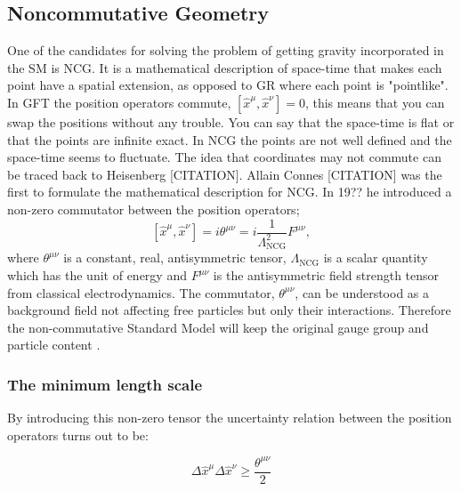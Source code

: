 \subsection{Noncommutative Geometry}
One of the candidates for solving the problem of getting gravity incorporated in the SM is NCG. It is a mathematical description of space-time that makes each point have a spatial extension, as opposed to GR where each point is "pointlike". In GFT the position operators commute, $[ \hat x^{\mu}, \hat x^{\nu}] = 0$, this means that you can swap the positions without any trouble. You can say that the space-time is flat or that the points are infinite exact. In NCG the points are not well defined and the space-time seems to fluctuate. The idea that coordinates may not commute can be traced back to Heisenberg [CITATION]. Allain Connes [CITATION] was the first to formulate the mathematical description for NCG. In 19?? he introduced a non-zero commutator between the position operators; \cite{rosendahl2008} 
\begin{equation} \label{eq:ncgtheta}
	[ \hat x^{\mu}, \hat x^{\nu}] = i \theta^{\mu \nu} = i \frac{1}{\Lambda_{\textrm{NCG}}^2} F^{\mu\nu},
\end{equation}
where $\theta^{\mu \nu}$ is a constant, real, antisymmetric tensor, $\Lambda_{\textrm{NCG}}$ is a scalar quantity which has the unit of energy and $F^{\mu\nu}$ is the antisymmetric field strength tensor from classical electrodynamics. The commutator, $\theta^{\mu \nu}$, can be understood as a background field not affecting free particles but only their interactions. Therefore the non-commutative Standard Model will keep the original gauge group and particle content \cite{rosendahl2008}.

\subsubsection{The minimum length scale}
By introducing this non-zero tensor the uncertainty relation between the position operators turns out to be:

\begin{equation}
\Delta \hat x^{\mu} \Delta \hat x^{\nu} \ge \frac{\theta^{\mu \nu}}{2}
\end{equation}

